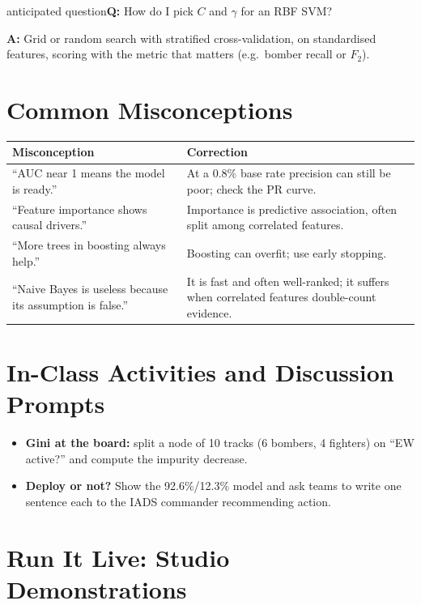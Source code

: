 \documentclass[11pt]{article}
\begin{document}
\begin{question}{anticipated question}\textbf{Q:} How do I pick $C$ and $\gamma$ for an RBF SVM?\par\smallskip\textbf{A:} Grid or random search with stratified cross-validation, on standardised features, scoring with the metric that matters (e.g.\ bomber recall or $F_2$).\end{question}

\section{Common Misconceptions}\begin{center}\small\renewcommand{\arraystretch}{1.35}\begin{tabularx}{\textwidth}{@{}>{\raggedright\arraybackslash}X >{\raggedright\arraybackslash}X@{}}\toprule\textbf{Misconception} & \textbf{Correction}\\\midrule``AUC near 1 means the model is ready.'' & At a 0.8\% base rate precision can still be poor; check the PR curve.\\
``Feature importance shows causal drivers.'' & Importance is predictive association, often split among correlated features.\\
``More trees in boosting always help.'' & Boosting can overfit; use early stopping.\\
``Naive Bayes is useless because its assumption is false.'' & It is fast and often well-ranked; it suffers when correlated features double-count evidence.\\\bottomrule\end{tabularx}\end{center}

\section{In-Class Activities and Discussion Prompts}\label{sec:act}\begin{itemize}\item \textbf{Gini at the board:} split a node of 10 tracks (6 bombers, 4 fighters) on ``EW active?'' and compute the impurity decrease.\item \textbf{Deploy or not?} Show the 92.6\%/12.3\% model and ask teams to write one sentence each to the IADS commander recommending action.\end{itemize}

\section{Run It Live: Studio Demonstrations}\label{sec:live}
\end{document}
